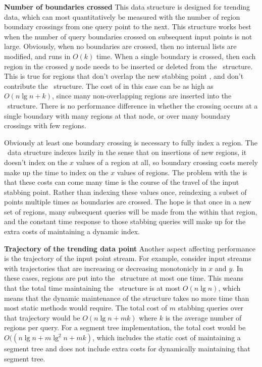 \documentclass{sig-alternate}
\newcommand{\ct}{\id{DCT}}
\newcommand{\inC}[1]{{\id{DCT_{#1}}}}
\newcommand{\X}{{\inC{X}}}
\newcommand{\A}{{\inC{A}}}
\begin{document}
{\bf Number of boundaries crossed}
%
This data structure is designed for trending data, which can most
quantitatively be measured with the number of region boundary
crossings from one query point to the next. This structure works best
when the number of query boundaries crossed on subsequent input points
is not large.  Obviously, when no boundaries are crossed, then no
internal lists are modified, and  runs in $O(k)$
time.  When a single boundary is crossed, then each region in the
crossed $y$ node needs to be inserted or deleted from the \X\ 
structure.  This is true for regions that don't overlap the new
stabbing point , and don't contribute the \A\ structure.  The
cost of \proc{Report-Regions} in this case can be as high as
$O(n\lg{n} + k)$, since many non-overlapping regions are inserted
into the \X\ structure.  There is no performance difference in whether
the crossing occurs at a single boundary with many regions at that
node, or over many boundary crossings with few regions.

Obviously at least one boundary crossing is necessary to fully index a
region.  The \id{DCT}\ data structure indexes lazily in the sense that
on insertions of new regions, it doesn't index on the $x$ values of a
region at all, so boundary crossing costs merely make up the time to
index on the $x$ values of regions.  The problem with the \ct is that
these costs can come many time is the course of the travel of the
input stabbing point.  Rather than indexing these values once,
reindexing a subset of points multiple times as boundaries are
crossed.  The hope is that once in a new set of regions, many
subsequent queries will be made from the within that region, and the
constant time response to those stabbing queries will make up for the
extra costs of maintaining a dynamic index.

{\bf Trajectory of the trending data point}
%
Another aspect affecting performance is the trajectory of the input
point stream.  For example, consider input streams with trajectories
that are increasing or decreasing monotonicly in $x$ and $y$.  In
these cases, regions are put into the \X\ structure at most one time.
This means that the total time maintaining the \X\ structure is at
most $O(n\lg{n})$, which means that the dynamic maintenance of the \X
structure takes no more time than most static methods would require.
The total cost of $m$ stabbing queries over that trajectory would be
$O(n\lg{n}+mk)$ where $k$ is the average number of regions per query.
For a segment tree implementation, the total cost would be
$O((n\lg{n}+m\lg^2{n}+mk)$, which includes the static cost of
maintaining a segment tree and does not include extra costs for
dynamically maintaining that segment tree.
\end{document}
